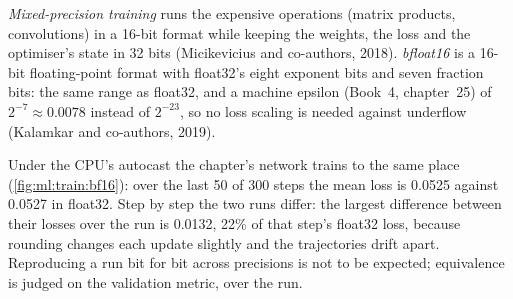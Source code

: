 \begin{definition}\label{def:ml:training-infrastructure:mixed}
\emph{Mixed-precision training} runs the expensive operations (matrix products, convolutions)
in a 16-bit format while keeping the weights, the loss and the optimiser's state in 32 bits (Micikevicius and co-authors,
2018). \emph{bfloat16} is a 16-bit floating-point format with float32's eight exponent bits and seven fraction
bits: the same range as float32, and a machine epsilon (Book~4, chapter~25) of $2^{-7}\approx0.0078$ instead of $2^{-23}$, so no
loss scaling is needed against underflow (Kalamkar and co-authors, 2019).
\end{definition}

Under the CPU's  autocast the chapter's network trains to the same place (\cref{fig:ml:train:bf16}): over the last 50
of 300 steps the mean loss is 0.0525 against 0.0527 in float32. Step by step the two runs differ: the largest difference between
their losses over the run is 0.0132, 22\% of that step's float32 loss, because rounding changes each update slightly and the
trajectories drift apart. Reproducing a run bit for bit across precisions is not to be expected; equivalence is judged on the
validation metric, over the run.

\begin{omfigure}

\label{fig:ml:train:bf16}
\end{omfigure}

